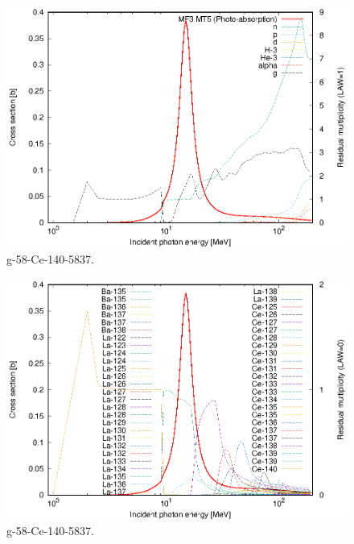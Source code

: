 \begin{figure}
 \includegraphics[width=\linewidth]{eps/g_58-Ce-140_5837.eps}
  \caption{g-58-Ce-140-5837.}
\end{figure}
\begin{figure}
 \includegraphics[width=\linewidth]{eps-law0/g_58-Ce-140_5837.eps}
 \caption{g-58-Ce-140-5837.}
\end{figure}
\newpage \clearpage

